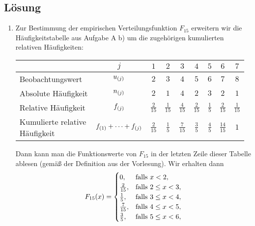 \documentclass{exercise}
\begin{document}
    \subsection*{Lösung}
    \begin{enumerate}
        \item Zur Bestimmung der empirischen Verteilungsfunktion \(F_{15}\) erweitern wir die Häufigkeitstabelle aus Aufgabe A b) um die zugehörigen kumulierten relativen Häufigkeiten:
        \begin{center}
            \begin{tabular}{lcccccccc}
                \toprule
                & \(j\) & \(1\) & \(2\) & \(3\) & \(4\) & \(5\) & \(6\) & \(7\)\\
                \midrule
                Beobachtungswert & \(u_{\parentheses*{j}}\) & \(2\) & \(3\) & \(4\) & \(5\) & \(6\) & \(7\) & \(8\)\\
                Absolute Häufigkeit & \(n_{\parentheses*{j}}\) & \(2\) & \(1\) & \(4\) & \(2\) & \(3\) & \(2\) & \(1\)\\
                Relative Häufigkeit & \(f_{\parentheses*{j}}\) & \(\frac{2}{15}\) & \(\frac{1}{15}\) & \(\frac{4}{15}\) & \(\frac{2}{15}\) & \(\frac{1}{5}\) & \(\frac{2}{15}\) & \(\frac{1}{15}\)\\
                \makecell[l]{Kumulierte relative\\Häufigkeit} & \(f_{\parentheses*{1}} + \cdots + f_{\parentheses*{j}}\) & \(\frac{2}{15}\) & \(\frac{1}{5}\) & \(\frac{7}{15}\) & \(\frac{3}{5}\) & \(\frac{4}{5}\) & \(\frac{14}{15}\) & \(1\)\\
                \bottomrule
            \end{tabular}
        \end{center}
        Dann kann man die Funktionswerte von \(F_{15}\) in der letzten Zeile dieser Tabelle ablesen (gemäß der Definition aus der Vorlesung).
        Wir erhalten dann
        \begin{equation}\label{eq:1}
            F_{15}\parentheses*{x} = \begin{cases}
                0, & \text{falls }x < 2,\\
                \frac{2}{15}, & \text{falls }2 \le x < 3,\\
                \frac{1}{5}, & \text{falls }3 \le x < 4,\\
                \frac{7}{15}, & \text{falls }4 \le x < 5,\\
                \frac{3}{5}, & \text{falls }5 \le x < 6,\\

\end{cases}
\end{equation}
\end{enumerate}
\end{document}
